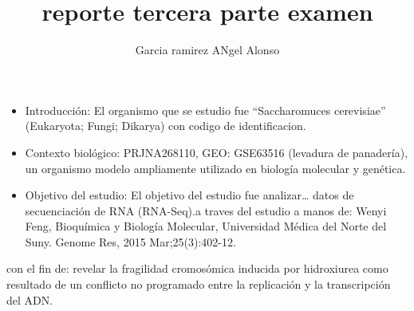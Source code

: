 \documentclass[
  letterpaper,
  DIV=11,
  numbers=noendperiod]{scrartcl}
\title{reporte tercera parte examen}
\author{Garcia ramirez ANgel Alonso}
\date{}
\begin{document}
\maketitle


\begin{itemize}
\item
  Introducción: El organismo que se estudio fue ``Saccharomuces
  cerevisiae'' (Eukaryota; Fungi; Dikarya) con codigo de identificacion.
\item
  Contexto biológico: PRJNA268110, GEO: GSE63516 (levadura de
  panadería), un organismo modelo ampliamente utilizado en biología
  molecular y genética.
\item
  Objetivo del estudio: El objetivo del estudio fue analizar\ldots{}
  datos de secuenciación de RNA (RNA-Seq).a traves del estudio a manos
  de: Wenyi Feng, Bioquímica y Biología Molecular, Universidad Médica
  del Norte del Suny. Genome Res, 2015 Mar;25(3):402-12.
\end{itemize}

con el fin de: revelar la fragilidad cromosómica inducida por
hidroxiurea como resultado de un conflicto no programado entre la
replicación y la transcripción del ADN.
\end{document}

